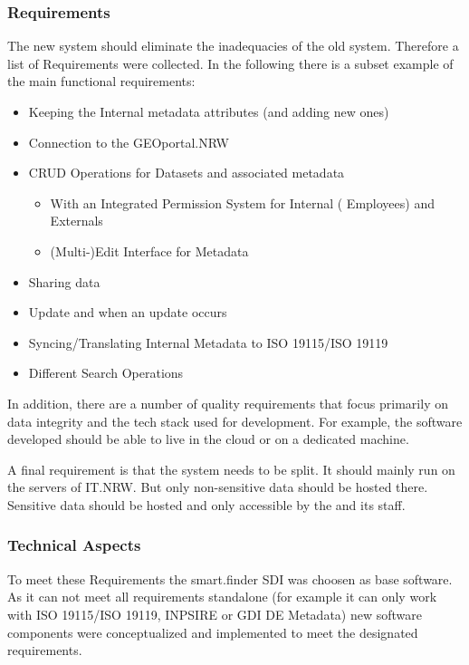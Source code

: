 \documentclass[11pt, titlepage, a4paper]{article}
\begin{document}
\subsubsection{Requirements}
The new system should eliminate the inadequacies of the old system. Therefore a list of Requirements were collected. In the following there is a subset example of the main functional requirements:
\begin{itemize}
    \item Keeping the Internal metadata attributes (and adding new ones)
    \item Connection to the GEOportal.NRW
    \item CRUD Operations for Datasets and associated metadata
          \begin{itemize}
              \item With an Integrated Permission System for Internal ( Employees) and Externals
              \item (Multi-)Edit Interface for Metadata
          \end{itemize}
    \item Sharing data
    \item Update  and  when an update occurs
    \item Syncing/Translating Internal Metadata to ISO 19115/ISO 19119
    \item Different Search Operations
\end{itemize}




In addition, there are a number of quality requirements that focus primarily on data integrity and the tech stack used for development. For example, the software developed should be able to live in the cloud or on a dedicated machine.

A final requirement is that the system needs to be split. It should mainly run on the servers of IT.NRW. But only non-sensitive data should be hosted there. Sensitive data should be hosted and only accessible by the  and its staff.

\subsubsection{Technical Aspects}
To meet these Requirements the smart.finder SDI was choosen as base software. As it can not meet all requirements standalone (for example it can only work with ISO 19115/ISO 19119, INPSIRE or GDI DE Metadata) new software components were conceptualized and implemented to meet the designated requirements.
\end{document}
